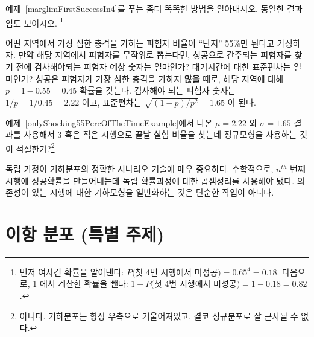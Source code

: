 \begin{exercise}

예제~\ref{marglimFirstSuccessIn4}를 푸는 좀더 똑똑한 방법을 알아내시오. 동일한 결과임도 보이시오.
\footnote{먼저 여사건 확률을 알아낸다: $P($첫 4번 시행에서 미성공$) = 0.65^4 = 0.18$. 다음으로, 1 에서 계산한 확률을 뺀다: $1-P($첫 4번 시행에서 미성공$) = 1-0.18 = 0.82$.}
\end{exercise}

\begin{example}{어떤 지역에서 가장 심한 충격을 가하는 피험자 비율이 ``단지'' 55\%만 된다고 가정하자. 만약 해당 지역에서 피험자를 무작위로 뽑는다면, 성공으로 간주되는 피험자를 찾기 전에 검사해야되는 피험자 예상 숫자는 얼마인가? 대기시간에 대한 표준편차는 얼마인가?} \label{onlyShocking55PercOfTheTimeExample}
성공은 피험자가 가장 심한 충격을 가하지 \textbf{않을} 때로, 해당 지역에 대해 $p=1-0.55=0.45$ 확률을 갖는다. 검사해야 되는 피험자 숫자는 $1/p = 1/0.45 = 2.22$ 이고, 표준편차는 $\sqrt{(1-p)/p^2} = 1.65$ 이 된다.
\end{example}

\begin{exercise}
예제~\ref{onlyShocking55PercOfTheTimeExample}에서 나온 $\mu = 2.22$ 와 $\sigma = 1.65$ 결과를 사용해서 3 혹은 적은 시행으로 끝날 실험 비율을 찾는데 정규모형을 사용하는 것이 적절한가?\footnote{아니다. 기하분포는 항상 우측으로 기울어져있고, 결코 정규분포로 잘 근사될 수 없다.}
\end{exercise}

독립 가정이 기하분포의 정확한 시나리오 기술에 매우 중요하다. 수학적으로, $n^{th}$ 번째 시행에 성공확률을 만들어내는데 독립 확률과정에 대한 곱셈정리를 사용해야 됐다. 의존성이 있는 시행에 대한 기하모형을 일반화하는 것은 단순한 작업이 아니다.



\section{이항 분포 (특별 주제)}
\label{binomialModel}

